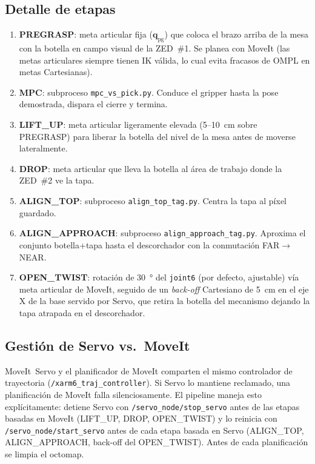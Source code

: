 \documentclass[conference]{IEEEtran}
\begin{document}
\subsection{Detalle de etapas}

\begin{enumerate}
  \item \textbf{PREGRASP}: meta articular fija ($\mathbf{q}_\text{pg}$)
        que coloca el brazo arriba de la mesa con la botella en
        campo visual de la ZED~\#1. Se planea con MoveIt (las metas
        articulares siempre tienen IK v\'alida, lo cual evita
        fracasos de OMPL en metas Cartesianas).
  \item \textbf{MPC}: subproceso \texttt{mpc\_vs\_pick.py}.
        Conduce el gripper hasta la pose demostrada,
        dispara el cierre y termina.
  \item \textbf{LIFT\_UP}: meta articular ligeramente elevada
        (5--10~cm sobre PREGRASP) para liberar la botella del nivel
        de la mesa antes de moverse lateralmente.
  \item \textbf{DROP}: meta articular que lleva la botella al \'area
        de trabajo donde la ZED~\#2 ve la tapa.
  \item \textbf{ALIGN\_TOP}: subproceso \texttt{align\_top\_tag.py}.
        Centra la tapa al p\'ixel guardado.
  \item \textbf{ALIGN\_APPROACH}: subproceso
        \texttt{align\_approach\_tag.py}. Aproxima el conjunto
        botella+tapa hasta el descorchador con la conmutaci\'on
        FAR$\rightarrow$NEAR.
  \item \textbf{OPEN\_TWIST}: rotaci\'on de \SI{+30}{\degree} del
        \texttt{joint6} (por defecto, ajustable) v\'ia meta articular
        de MoveIt, seguido de un \emph{back-off} Cartesiano de
        \SI{5}{\centi\meter} en el eje X de la base servido por
        Servo, que retira la botella del mecanismo dejando la tapa
        atrapada en el descorchador.
\end{enumerate}

\subsection{Gesti\'on de Servo vs.\ MoveIt}

MoveIt~Servo y el planificador de MoveIt comparten el mismo
controlador de trayectoria (\texttt{/xarm6\_traj\_controller}). Si
Servo lo mantiene reclamado, una planificaci\'on de MoveIt falla
silenciosamente. El pipeline maneja esto expl\'icitamente: detiene
Servo con \texttt{/servo\_node/stop\_servo} antes de las etapas
basadas en MoveIt (LIFT\_UP, DROP, OPEN\_TWIST) y lo reinicia con
\texttt{/servo\_node/start\_servo} antes de cada etapa basada en
Servo (ALIGN\_TOP, ALIGN\_APPROACH, back-off del OPEN\_TWIST). Antes
de cada planificaci\'on se limpia el octomap.
\end{document}
